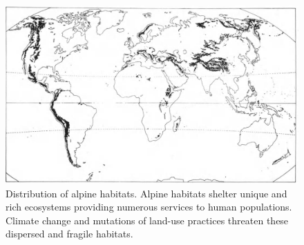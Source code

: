 \begin{figure}
\includegraphics{./1_Introduction/graphics/alpine_distribution.jpeg}
\caption{Distribution of alpine habitats. Alpine habitats shelter unique and rich ecosystems providing numerous services to human populations. Climate change and mutations of land-use practices threaten these dispersed and fragile habitats.}
\end{figure}

